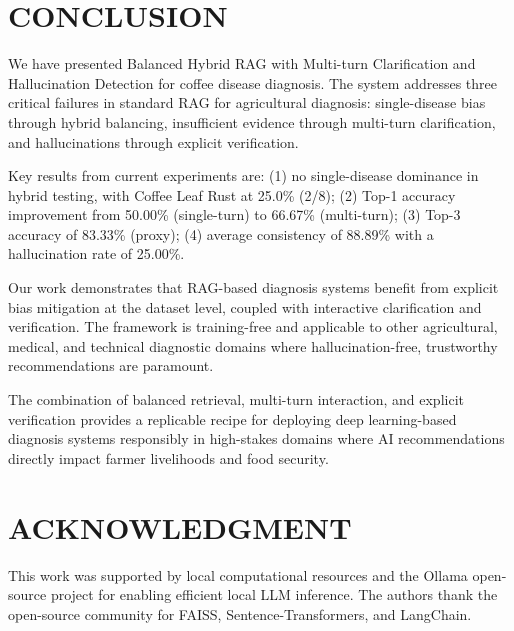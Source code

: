 \documentclass[conference]{IEEEtran}
\begin{document}
\section{CONCLUSION}

We have presented Balanced Hybrid RAG with Multi-turn Clarification and Hallucination Detection for coffee disease diagnosis. The system addresses three critical failures in standard RAG for agricultural diagnosis: single-disease bias through hybrid balancing, insufficient evidence through multi-turn clarification, and hallucinations through explicit verification.

Key results from current experiments are: (1) no single-disease dominance in hybrid testing, with Coffee Leaf Rust at 25.0\% (2/8); (2) Top-1 accuracy improvement from 50.00\% (single-turn) to 66.67\% (multi-turn); (3) Top-3 accuracy of 83.33\% (proxy); (4) average consistency of 88.89\% with a hallucination rate of 25.00\%.

Our work demonstrates that RAG-based diagnosis systems benefit from explicit bias mitigation at the dataset level, coupled with interactive clarification and verification. The framework is training-free and applicable to other agricultural, medical, and technical diagnostic domains where hallucination-free, trustworthy recommendations are paramount.

The combination of balanced retrieval, multi-turn interaction, and explicit verification provides a replicable recipe for deploying deep learning-based diagnosis systems responsibly in high-stakes domains where AI recommendations directly impact farmer livelihoods and food security.

\section*{ACKNOWLEDGMENT}

This work was supported by local computational resources and the Ollama open-source project for enabling efficient local LLM inference. The authors thank the open-source community for FAISS, Sentence-Transformers, and LangChain.
\end{document}
